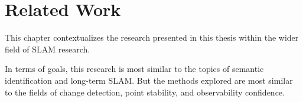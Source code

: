 \section{Related Work}
\label{sec:related_work}

This chapter contextualizes the research presented in this thesis within the wider field of SLAM research. 

In terms of goals, this research is most similar to the topics of semantic identification and long-term SLAM. But the methods explored are most similar to the fields of change detection, point stability, and observability confidence.

% 
